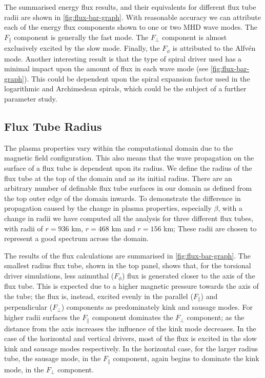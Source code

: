 The summarised energy flux results, and their equivalents for different flux tube radii are shown in \cref{fig:flux-bar-graph}.
With reasonable accuracy we can attribute each of the energy flux components shown to one or two MHD wave modes.
The $F_\parallel$ component is generally the fast mode. 
The $F_\perp$ component is almost exclusively excited by the slow mode.
Finally, the $F_\phi$ is attributed to the Alfv\'en mode.
Another interesting result is that the type of spiral driver used has a minimal impact upon the amount of flux in each wave mode (see \cref{fig:flux-bar-graph}).
This could be dependent upon the spiral expansion factor used in the logarithmic and Archimedean spirals, which could be the subject of a further parameter study.

\subsection{Flux Tube Radius}
The plasma properties vary within the computational domain due to the magnetic field configuration.
This also means that the wave propagation on the surface of a flux tube is dependent upon its radius. 
We define the radius of the flux tube at the top of the domain and as its initial radius.
There are an arbitrary number of definable flux tube surfaces in our domain as defined from the top outer edge of the domain inwards. 
To demonstrate the difference in propagation caused by the change in plasma properties, especially $\beta$, with a change in radii we have computed all the analysis for three different flux tubes, with radii of $r=936$ km, $r=468$ km and  $r=156$ km; These radii are chosen to represent a good spectrum across the domain.

The results of the flux calculations are summarised in \cref{fig:flux-bar-graph}.
The smallest radius flux tube, shown in the top panel, shows that, for the torsional driver simulations, less azimuthal ($F_\phi$) flux is generated closer to the axis of the flux tube. 
This is expected due to a higher magnetic pressure towards the axis of the tube; the flux is, instead, excited evenly in the parallel ($F_\parallel$) and perpendicular ($F_\perp$) components as predominately kink and sausage modes. 
For higher radii surfaces the $F_\parallel$ component dominates the $F_\perp$ component; as the distance from the axis increases the influence of the kink mode decreases.
In the case of the horizontal and vertical drivers, most of the flux is excited in the slow kink and sausage modes respectively.
In the horizontal case, for the larger radius tube, the sausage mode, in the $F_\parallel$ component, again begins to dominate the kink mode, in the $F_\perp$ component.


